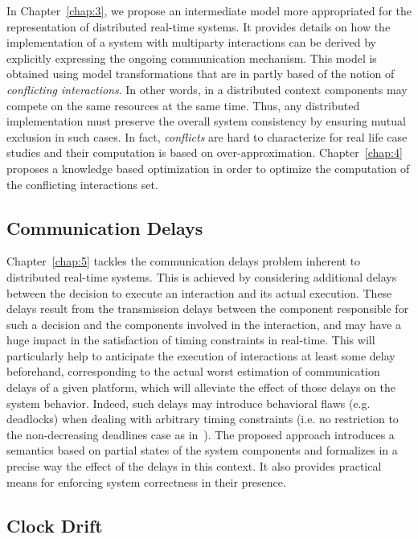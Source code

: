 In Chapter~\ref{chap:3}, we propose an intermediate model more appropriated for the 
representation of distributed real-time systems. It provides details on how the 
implementation of a system with multiparty interactions can be derived by explicitly expressing
the ongoing communication mechanism. This model is obtained using model transformations that
are in partly based of the notion of \emph{conflicting interactions}. In other words,
in a distributed context components may compete on the same resources at the same time. Thus,
any distributed implementation must preserve the overall system consistency by ensuring 
mutual exclusion in such cases. In fact, \emph{conflicts} are hard to characterize for real life
case studies and their computation is based on over-approximation. Chapter~\ref{chap:4} proposes
a knowledge based optimization in order to optimize the computation of the conflicting 
interactions set.


\subsection*{Communication Delays}

Chapter~\ref{chap:5} tackles the communication delays problem inherent to distributed real-time
systems. This is achieved by considering additional delays between the decision to execute 
an interaction and its actual execution. These delays result from the transmission
delays between the component responsible for such a decision and the components involved in
the interaction, and may have a huge impact in the satisfaction of timing constraints in 
real-time.
This will particularly help to anticipate the execution of interactions at 
least some delay beforehand, corresponding to the actual worst estimation of communication 
delays of a given platform, which will alleviate the effect of those delays on the system 
behavior.
Indeed, such delays may introduce behavioral flaws (e.g. deadlocks) when dealing with
arbitrary timing constraints (i.e. no restriction to the non-decreasing deadlines case
as in~\cite{ahlem:these}). The proposed approach introduces a semantics based on partial states
of the system components and formalizes in a precise way the effect of the delays
in this context. It also provides practical means for enforcing system correctness in their 
presence. 

\subsection*{Clock Drift}

